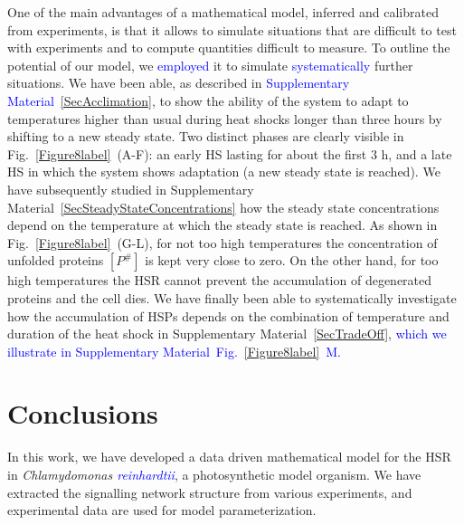 \documentclass[oneside, 10pt, a4paper, twocolumn]{article}
\begin{document}
One of the main advantages of a mathematical model, inferred and calibrated from experiments, is that it allows to simulate situations that are difficult to test with experiments and to compute quantities difficult to measure. To outline the potential of our model, we \textcolor{blue}{employed} it to simulate \textcolor{blue}{systematically} further situations. 
We have been able, as described in \textcolor{blue}{Supplementary Material~\ref{SecAcclimation}}, to show the ability of the system to adapt to temperatures higher than usual during heat shocks longer than three hours by shifting to a new steady state. Two distinct phases are clearly visible in Fig.~\ref{Figure8label}~(A-F): an early HS lasting for about the first $3$ h, and a late HS in which the system shows adaptation (a new steady state is reached). 
We have subsequently studied in Supplementary Material~\ref{SecSteadyStateConcentrations} how the steady state concentrations depend on the temperature at which the steady state is reached. As shown in Fig.~\ref{Figure8label}~(G-L), for not too high temperatures the concentration of unfolded proteins $\left[P^\#\right]$ is kept very close to zero. On the other hand, for too high temperatures the HSR cannot prevent the accumulation of degenerated proteins and the cell dies. 
We have finally been able to systematically investigate how the accumulation of HSPs depends on the combination of temperature and duration of the heat shock in Supplementary Material~\ref{SecTradeOff}, \textcolor{blue}{which we illustrate in Supplementary Material~Fig.~\ref{Figure8label}~M.} 






\section{Conclusions}
\label{SectionConclusions}

In this work, we have developed a data driven mathematical model for the HSR in \emph{Chlamydomonas \textcolor{blue}{reinhardtii}}, a photosynthetic model organism. We have extracted the signalling network structure from various experiments, and experimental data are used for model parameterization.
\end{document}
